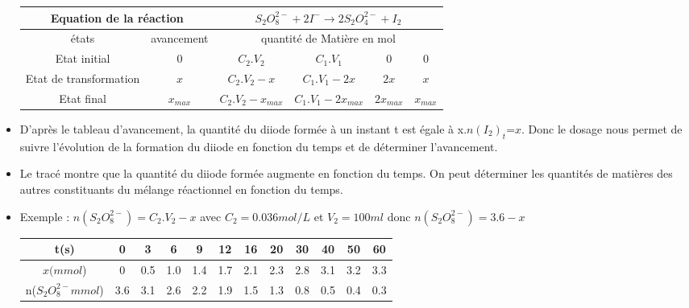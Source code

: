 \documentclass[12pt]{article}
\begin{document}
\begin{itemize}
	      \begin{tabular}{|c|c|c|c|c|c|}
		      \hline
		      \multicolumn{2}{|c|}{Equation de la réaction} & \multicolumn{4}{c|}{${ S_2O_8^{2-} + 2I^- \rightarrow 2S_2O_4^{2-} + I_2}$}                                                                                                        \\\hline
		      états                                         & avancement                                                                  & \multicolumn{4}{|c|}{quantité de Matière en mol}                                                     \\\hline
		      Etat initial                                  & 0                                                                           & $ C_2.V_2$                                       & $ C_1.V_1$             & $ 0$       & $ 0$        \\\hline
		      Etat de transformation                        & $x$                                                                         & $ C_2.V_2 - x$                                   & $ C_1.V_1 -  2x$       & $ 2x$      & $ x$        \\\hline
		      Etat final                                    & $x_{max}$                                                                   & $  C_2.V_2 - x_{max}$                            & $  C_1.V_1 - 2x_{max}$ & $2x_{max}$ & $  x_{max}$ \\\hline
	      \end{tabular}

	\item D'après le tableau d'avancement, la quantité du diiode formée à un instant t est égale à x.${n(I_2)}_t$=$x$. Donc le dosage nous permet de suivre l'évolution de la formation du diiode en fonction du temps et de déterminer l'avancement.
	\item Le tracé montre que la quantité du diiode formée augmente en fonction du temps.
	      On peut déterminer les quantités de matières des autres constituants du mélange réactionnel en fonction du temps.

	\item Exemple : $n(S_2O_8^{2-}) = C_2.V_2 - x$ avec $C_2 = 0.036mol/L$  et $V_2 = 100ml$ donc $n(S_2O_8^{2-}) = 3.6 - x $

	      \begin{center}
		      \begin{tabular}{|c|c|c|c|c|c|c|c|c|c|c|c|}
			      \hline
			      t(s)                  & 0   & 3   & 6   & 9   & 12  & 16  & 20  & 30  & 40  & 50  & 60  \\\hline
			      $x (mmol$)            & 0   & 0.5 & 1.0 & 1.4 & 1.7 & 2.1 & 2.3 & 2.8 & 3.1 & 3.2 & 3.3 \\\hline
			      n($S_2O_8^{2-} mmol$) & 3.6 & 3.1 & 2.6 & 2.2 & 1.9 & 1.5 & 1.3 & 0.8 & 0.5 & 0.4 & 0.3 \\\hline
		      \end{tabular}
	      \end{center}


\end{itemize}
\end{document}
